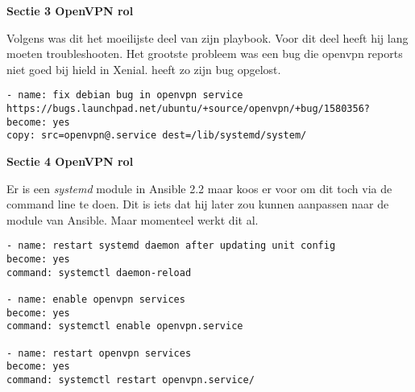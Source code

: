 \textbf{Sectie 3 OpenVPN rol}

Volgens \autocite{scottharney} was dit het moeilijste deel van zijn playbook. Voor dit deel heeft hij lang moeten troubleshooten. Het grootste probleem was een bug die openvpn reports niet goed bij hield in Xenial. \autocite{scottharney} heeft zo zijn bug opgelost.
\begin{lstlisting}[basicstyle=\small]
- name: fix debian bug in openvpn service
https://bugs.launchpad.net/ubuntu/+source/openvpn/+bug/1580356?
become: yes
copy: src=openvpn@.service dest=/lib/systemd/system/
\end{lstlisting}

\textbf{Sectie 4 OpenVPN rol}

Er is een \textit{systemd} module in Ansible 2.2 maar \autocite{scottharney} koos er voor om dit toch via de command line te doen. Dit is iets dat hij later zou kunnen aanpassen naar de module van Ansible. Maar momenteel werkt dit al.
\begin{lstlisting}[basicstyle=\small]
- name: restart systemd daemon after updating unit config
become: yes
command: systemctl daemon-reload

- name: enable openvpn services
become: yes
command: systemctl enable openvpn.service

- name: restart openvpn services
become: yes
command: systemctl restart openvpn.service/
\end{lstlisting}











